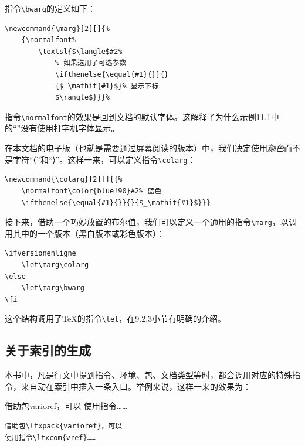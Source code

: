 指令\verb|\bwarg|的定义如下：

\begin{dmd}
\begin{verbatim}
\newcommand{\marg}[2][]{% 
    {\normalfont%
        \textsl{$\langle$#2%
            % 如果选用了可选参数 
            \ifthenelse{\equal{#1}{}}{} 
            {$_\mathit{#1}$}% 显示下标
            $\rangle$}}}%
\end{verbatim}
\end{dmd}

指令\verb|\normalfont|的效果是回到文档的默认字体。这解释了为什么示例11.1中的“”没有使用打字机字体显示。

在本文档的电子版（也就是需要通过屏幕阅读的版本）中，我们决定使用\emph{颜色}而不是字符“⟨”和“⟩”。这样一来，可以定义指令\verb|\colarg|：

\begin{dmd}
\begin{verbatim}
\newcommand{\colarg}[2][]{{% 
    \normalfont\color{blue!90}#2% 蓝色 
    \ifthenelse{\equal{#1}{}}{}{$_\mathit{#1}$}}}
\end{verbatim}
\end{dmd}

接下来，借助一个巧妙放置的布尔值，我们可以定义一个通用的指令\verb|\marg|，以调用其中的一个版本（黑白版本或彩色版本）：

\begin{dmd}
\begin{verbatim}
\ifversionenligne
    \let\marg\colarg
\else
    \let\marg\bwarg
\fi
\end{verbatim}
\end{dmd}

这个结构调用了\TeX 的指令\verb|\let|，在9.2.3小节有明确的介绍。

\subsection{关于索引的生成}

本书中，凡是行文中提到指令、环境、包、文档类型等时，都会调用对应的特殊指令，来自动在索引中插入一条入口。举例来说，这样一来的效果为：

\begin{codelist}[11.3]{
借助包\textsf{varioref}，可以
使用指令……
}\begin{verbatim}
借助包\ltxpack{varioref}，可以
使用指令\ltxcom{vref}……
\end{verbatim}
\end{codelist}


